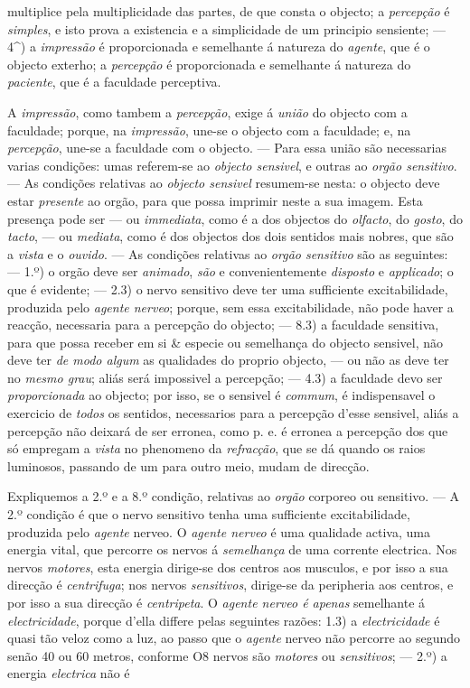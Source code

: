 multiplice pela multiplicidade das partes, de que consta o objecto; a \emph{percepção} é \emph{simples}, e isto prova a existencia e a simplicidade de um principio sensiente; --- 4\textasciicircum{}) a \emph{impressão} é proporcionada e semelhante á natureza do \emph{agente}, que é o objecto exterho; a \emph{percepção} é proporcionada e semelhante á natureza do \emph{paciente}, que é a faculdade perceptiva.\par A \emph{impressão}, como tambem a \emph{percepção}, exige á \emph{união} do objecto com a faculdade; porque, na \emph{impressão}, une-se o objecto com a faculdade; e, na \emph{percepção}, une-se a faculdade com o objecto. --- Para essa união são necessarias varias condições: umas referem-se ao \emph{objecto sensivel}, e outras ao \emph{orgão sensitivo}. --- As condições relativas ao \emph{objecto sensivel} resumem-se nesta: o objecto deve estar \emph{presente} ao orgão, para que possa imprimir neste a sua imagem. Esta presença pode ser --- ou \emph{immediata}, como é a dos objectos do \emph{olfacto}, do \emph{gosto}, do \emph{tacto}, --- ou \emph{mediata}, como é dos objectos dos dois sentidos mais nobres, que são a \emph{vista} e o \emph{ouvido}. --- As condições relativas ao \emph{orgão sensitivo} são as seguintes: --- 1.º) o orgão deve ser \emph{animado}, \emph{são} e convenientemente \emph{disposto} e \emph{applicado}; o que é evidente; --- 2.3) o nervo sensitivo deve ter uma sufficiente excitabilidade, produzida pelo \emph{agente nerveo}; porque, sem essa excitabilidade, não pode haver a reacção, necessaria para a percepção do objecto; --- 8.3) a faculdade sensitiva, para que possa receber em si \& especie ou semelhança do objecto sensivel, não deve ter \emph{de modo algum} as qualidades do proprio objecto, --- ou não as deve ter no \emph{mesmo grau}; aliás será impossivel a percepção; --- 4.3) a faculdade devo ser \emph{proporcionada} ao objecto; por isso, se o sensivel é \emph{commum}, é indispensavel o exercicio de \emph{todos} os sentidos, necessarios para a percepção d'esse sensivel, aliás a percepção não deixará de ser erronea, como p. e. é erronea a percepção dos que só empregam a \emph{vista} no phenomeno da \emph{refracção}, que se dá quando os raios luminosos, passando de um para outro meio, mudam de direcção.\par Expliquemos a 2.º e a 8.º condição, relativas ao \emph{orgão} corporeo ou sensitivo. --- A 2.º condição é que o nervo sensitivo tenha uma sufficiente excitabilidade, produzida pelo \emph{agente} nerveo. O \emph{agente nerveo} é uma qualidade activa, uma energia vital, que percorre os nervos á \emph{semelhança} de uma corrente electrica. Nos nervos \emph{motores}, esta energia dirige-se dos centros aos musculos, e por isso a sua direcção é \emph{centrifuga}; nos nervos \emph{sensitivos}, dirige-se da peripheria aos centros, e por isso a sua direcção é \emph{centripeta}. O \emph{agente nerveo é apenas} semelhante á \emph{electricidade}, porque d'ella differe pelas seguintes razões: 1.3) a \emph{electricidade} é quasi tão veloz como a luz, ao passo que o \emph{agente} nerveo não percorre ao segundo senão 40 ou 60 metros, conforme O8 nervos são \emph{motores} ou \emph{sensitivos}; --- 2.º) a energia \emph{electrica} não é 